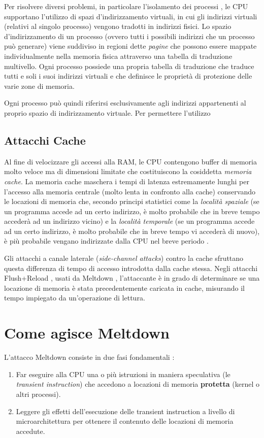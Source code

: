 Per risolvere diversi problemi, in particolare l'isolamento dei processi \cite{lettieri:paginazione}, le CPU supportano l'utilizzo di spazi d'indirizzamento virtuali, in cui gli indirizzi virtuali (relativi al singolo processo) vengono tradotti in indirizzi fisici. 
Lo spazio d'indirizzamento di un processo (ovvero tutti i possibili indirizzi che un processo può generare) viene suddiviso in regioni dette \emph{pagine} che possono essere mappate individualmente nella memoria fisica attraverso una tabella di traduzione multivello. 
Ogni processo possiede una propria tabella di traduzione che traduce tutti e soli i suoi indirizzi virtuali e che definisce le proprietà di protezione delle varie zone di memoria. 

Ogni processo può quindi riferirsi esclusivamente agli indirizzi appartenenti al proprio spazio di indirizzamento virtuale. Per permettere l'utilizzo 


\subsection{Attacchi Cache}
Al fine di velocizzare gli accessi alla RAM, le CPU contengono buffer di memoria molto veloce ma di dimensioni limitate che costituiscono la cosiddetta \emph{memoria cache}. La memoria cache maschera i tempi di latenza estremamente lunghi per l'accesso alla memoria centrale (molto lenta in confronto alla cache) conservando le locazioni di memoria che, secondo principi statistici come la \emph{località spaziale} (se un programma accede ad un certo indirizzo, è molto probabile che in breve tempo accederà ad un indirizzo vicino)  e la \emph{località temporale} (se un programma accede ad un certo indirizzo, è molto probabile che in breve tempo vi accederà di nuovo), è più probabile vengano indirizzate dalla CPU nel breve periodo \cite{lettieri:cache}.

Gli attacchi a canale laterale (\emph{side-channel attacks}) contro la cache sfruttano questa differenza di tempo di accesso introdotta dalla cache stessa. Negli attacchi Flush+Reload \cite{yaron:flush-reload}, usati da Meltdown \cite{lipp:meltdown}, l'attaccante è in grado di determinare se una locazione di memoria è stata precedentemente caricata in cache, misurando il tempo impiegato da un'operazione di lettura.

\section{Come agisce Meltdown}
L'attacco Meltdown consiste in due fasi fondamentali \cite{lipp:meltdown}:
\begin{enumerate}
	\item Far eseguire alla CPU una o più istruzioni in maniera speculativa (le \emph{transient instruction}) che accedono a locazioni di memoria \textbf{protetta} (kernel o altri processi).
	\item Leggere gli effetti dell'esecuzione delle transient instruction a livello di microarchitettura per ottenere il contenuto delle locazioni di memoria accedute.

\end{enumerate}

